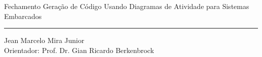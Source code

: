 \documentclass[handout,aspectratio = 169]{beamer}
\begin{document}
\begin{frame}{Fechamento}
    \centering
    Geração de Código Usando Diagramas de Atividade para Sistemas Embarcados
   \par\noindent\rule{\textwidth}{0.5pt}
    Jean Marcelo Mira Junior\\
    Orientador: Prof. Dr. Gian Ricardo Berkenbrock

\end{frame}
\end{document}
